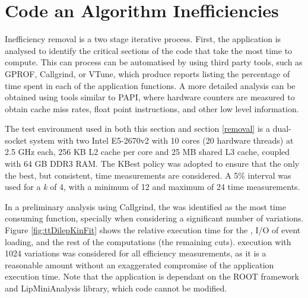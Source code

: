 \section{Code an Algorithm Inefficiencies}
\label{identification}

Inefficiency removal is a two stage iterative process. First, the application is analysed to identify the critical sections of the code that take the most time to compute. This can process can be automatised by using third party tools, such as GPROF, Callgrind, or VTune, which produce reports listing the percentage of time spent in each of the application functions. A more detailed analysis can be obtained using tools similar to PAPI, where hardware counters are measured to obtain cache miss rates, float point instructions, and other low level information.

The test environment used in both this section and section \ref{removal} is a dual-socket system with two Intel E5-2670v2 with 10 cores (20 hardware threads) at 2.5 GHz each, 256 KB L2 cache per core and 25 MB shared L3 cache, coupled with 64 GB DDR3 RAM. The KBest policy was adopted to ensure that the only the best, but consistent, time measurements are considered. A 5\% interval was used for a \textit{k} of 4, with a minimum of 12 and maximum of 24 time measurements.

In a preliminary analysis using Callgrind, the \ttDilepKinFit was identified as the most time consuming function, specially when considering a significant number of variations. Figure \ref{fig:ttDilepKinFit} shows the relative execution time for the \ttDilepKinFit, I/O of event loading, and the rest of the computations (the remaining cuts). \tth execution with 1024 variations was considered for all efficiency measurements, as it is a reasonable amount without an exaggerated compromise of the application execution time. Note that the application is dependant on the ROOT framework and LipMiniAnalysis library, which code cannot be modified.

